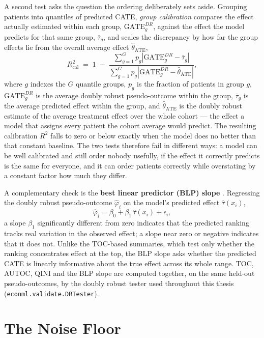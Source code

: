 A second test asks the question the ordering deliberately sets aside.
Grouping patients into quantiles of predicted CATE, \emph{group calibration}
\citep{dwivedi2020} compares the effect actually estimated within each group, $\text{GATE}_g^{DR}$,
against the effect the model predicts for that same group, $\bar\tau_g$, and
scales the discrepancy by how far the group effects lie from the overall
average effect $\hat\theta_{\text{ATE}}$,
\[
R^2_{\text{cal}} \;=\; 1 \;-\; \frac{\displaystyle\sum_{g=1}^{G} p_g \left|\text{GATE}_g^{DR} - \bar\tau_g\right|}{\displaystyle\sum_{g=1}^{G} p_g \left|\text{GATE}_g^{DR} - \hat\theta_{\text{ATE}}\right|},
\]
where $g$ indexes the $G$ quantile groups, $p_g$ is the fraction of patients
in group $g$, $\text{GATE}_g^{DR}$ is the average doubly robust pseudo-outcome
within the group, $\bar\tau_g$ is the average predicted effect within the
group, and $\hat\theta_{\text{ATE}}$ is the doubly robust estimate of the
average treatment effect over the whole cohort --- the effect a model that
assigns every patient the cohort average would predict. The resulting
calibration $R^2$ falls to zero or below exactly when the model does no
better than that constant baseline. The two tests therefore fail in different
ways: a model can be well calibrated and still order nobody usefully, if the
effect it correctly predicts is the same for everyone, and it can order
patients correctly while overstating by a constant factor how much they
differ.

\vspace{10pt}

A complementary check is the \textbf{best linear predictor (BLP) slope}
\citep{chernozhukov2022}. Regressing the doubly robust pseudo-outcome
$\hat\varphi_i$ on the model's predicted effect $\hat\tau(x_i)$,
\[
\hat\varphi_i = \beta_0 + \beta_1\,\hat\tau(x_i) + \epsilon_i,
\]
a slope $\beta_1$ significantly different from zero indicates that the
predicted ranking tracks real variation in the observed effect; a slope
near zero or negative indicates that it does not. Unlike the TOC-based
summaries, which test only whether the ranking concentrates effect at the
top, the BLP slope asks whether the predicted CATE is linearly informative
about the true effect across its whole range. TOC, AUTOC, QINI and the BLP
slope are computed together, on the same held-out pseudo-outcomes, by the
doubly robust tester used throughout this thesis
(\texttt{econml.validate.DRTester}).

\section{The Noise Floor}


